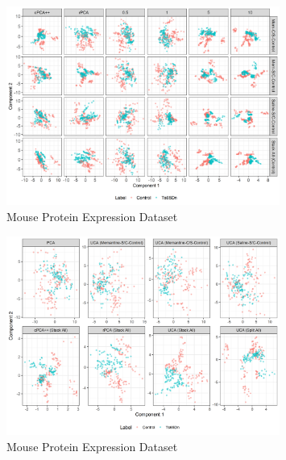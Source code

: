 \documentclass[12pt]{article}
\begin{document}
\begin{figure}[!ht]
    \centering
	\includegraphics[width = 0.8\textwidth]{figure/Mouse_stack_cpc_rpcControl.png}
	\caption{Mouse Protein Expression Dataset}
	\label{fig:mouse_control_vary}
\end{figure}

\begin{figure}[!ht]
    \centering
	\includegraphics[width = 0.8\textwidth]{figure/Mouse_split_stack_Control.png}
	\caption{Mouse Protein Expression Dataset}
	\label{fig:mouse_stack_control}
\end{figure}
\end{document}
